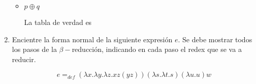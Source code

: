 \documentclass{article}
\begin{document}
\begin{enumerate}
{\begin{itemize}
{\begin{itemize}
{                        }
                        \item {
                            $p \oplus q$

                            La tabla de verdad es 
                        }
                    \end{itemize}
                }
            \end{itemize}
        }

        \item {
            Encientre la forma normal de la siguiente expresión $e$. Se debe
            mostrar todos los pasos de la $\beta-$reducción, indicando en cada
            paso el redex que se va a reducir.

            \[
                e =_{def} (\lambda x. \lambda y. \lambda z.xz(yz))
                (\lambda s. \lambda t.s)
                (\lambda u. u) w
            \]
        }
    \end{enumerate}
\end{document}
